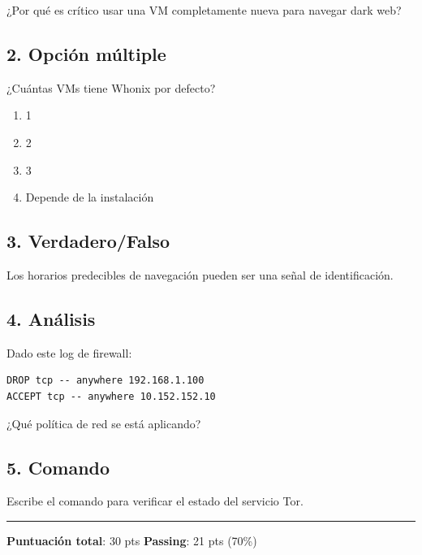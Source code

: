 \documentclass[
  letterpaper,
]{report}
\providecommand{\tightlist}{%
  \setlength{\itemsep}{0pt}\setlength{\parskip}{0pt}}
\begin{document}
¿Por qué es crítico usar una VM completamente nueva para navegar dark
web?

\subsection{2. Opción múltiple}\label{opciuxf3n-muxfaltiple}

¿Cuántas VMs tiene Whonix por defecto?

\begin{enumerate}
\def\labelenumi{\alph{enumi})}
\tightlist
\item
  1\\
\item
  2\\
\item
  3\\
\item
  Depende de la instalación
\end{enumerate}

\subsection{3. Verdadero/Falso}\label{verdaderofalso}

Los horarios predecibles de navegación pueden ser una señal de
identificación.

\subsection{4. Análisis}\label{anuxe1lisis}

Dado este log de firewall:

\begin{verbatim}
DROP tcp -- anywhere 192.168.1.100
ACCEPT tcp -- anywhere 10.152.152.10
\end{verbatim}

¿Qué política de red se está aplicando?

\subsection{5. Comando}\label{comando}

Escribe el comando para verificar el estado del servicio Tor.

\begin{center}\rule{0.5\linewidth}{0.5pt}\end{center}

\textbf{Puntuación total}: 30 pts \textbar{} \textbf{Passing}: 21 pts
(70\%)
\end{document}
